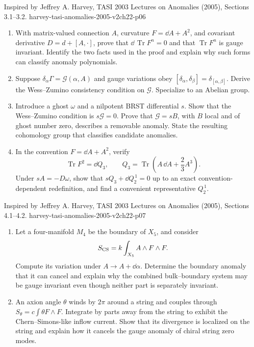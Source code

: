 \begin{enumerate}
  {Inspired by Jeffrey A. Harvey, TASI 2003 Lectures on Anomalies
  (2005), Sections 3.1--3.2.}
  {harvey-tasi-anomalies-2005-v2ch22-p06}
  \begin{enumerate}
    \item[(a)]
    With matrix-valued connection \(A\), curvature
    \(F=\dd A+A^2\), and covariant derivative \(D=d+[A,\cdot]\), prove that
    \(\dd\,\operatorname{Tr}F^n=0\) and that
    \(\operatorname{Tr}F^n\) is gauge invariant.  Identify the two facts
    used in the proof and explain why such forms can classify anomaly
    polynomials.
    \item[(b)]
    Suppose
    \(\delta_\alpha\Gamma=\mathcal G(\alpha,A)\) and gauge variations obey
    \([\delta_\alpha,\delta_\beta]=\delta_{[\alpha,\beta]}\).
    Derive the Wess--Zumino consistency condition on \(\mathcal G\).
    Specialize to an Abelian group.
    \item[(c)]
    Introduce a ghost \(\omega\) and a nilpotent BRST differential \(s\).
    Show that the Wess--Zumino condition is \(s\mathcal G=0\).  Prove that
    \(\mathcal G=sB\), with \(B\) local and of ghost number zero, describes
    a removable anomaly.  State the resulting cohomology group that
    classifies candidate anomalies.
    \item[(d)]
    In the convention \(F=\dd A+A^2\), verify
    \[
      \operatorname{Tr}F^2=\dd Q_3,\qquad
      Q_3=\operatorname{Tr}\left(A\,\dd A+\frac23A^3\right).
    \]
    Under \(sA=-D\omega\), show that
    \(sQ_3+\dd Q_2^{\,1}=0\) up to an exact convention-dependent
    redefinition, and find a convenient representative \(Q_2^{\,1}\).
  \end{enumerate}

  {Inspired by Jeffrey A. Harvey, TASI 2003 Lectures on Anomalies
  (2005), Sections 4.1--4.2.}
  {harvey-tasi-anomalies-2005-v2ch22-p07}
  \begin{enumerate}
    \item[(a)]
    Let a four-manifold \(M_4\) be the boundary of \(X_5\), and consider
    \[
      S_{\rm CS}=k\int_{X_5}A\wedge F\wedge F.
    \]
    Compute its variation under \(A\to A+\dd\alpha\).  Determine the
    boundary anomaly that it can cancel and explain why the combined
    bulk--boundary system may be gauge invariant even though neither
    part is separately invariant.
    \item[(b)]
    An axion angle \(\theta\) winds by \(2\pi\) around a string and couples
    through
    \(S_\theta=c\int\theta F\wedge F\).
    Integrate by parts away from the string to exhibit the
    Chern--Simons-like inflow current.  Show that its divergence is
    localized on the string and explain how it cancels the gauge anomaly
    of chiral string zero modes.
  \end{enumerate}


\end{enumerate}
